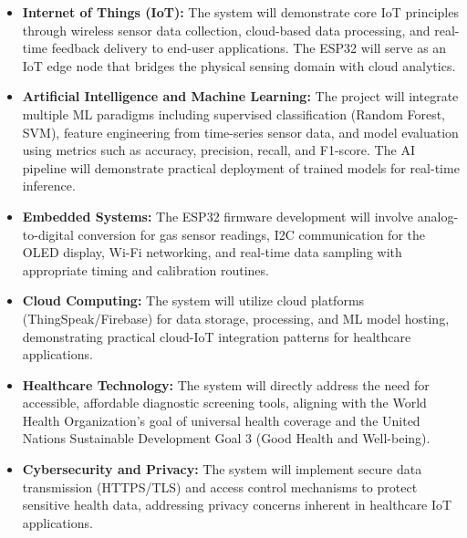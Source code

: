 \begin{itemize}[leftmargin=1.5cm]
\item \textbf{Internet of Things (IoT):} The system will demonstrate core IoT principles through wireless sensor data collection, cloud-based data processing, and real-time feedback delivery to end-user applications. The ESP32 will serve as an IoT edge node that bridges the physical sensing domain with cloud analytics.

\item \textbf{Artificial Intelligence and Machine Learning:} The project will integrate multiple ML paradigms including supervised classification (Random Forest, SVM), feature engineering from time-series sensor data, and model evaluation using metrics such as accuracy, precision, recall, and F1-score. The AI pipeline will demonstrate practical deployment of trained models for real-time inference.

\item \textbf{Embedded Systems:} The ESP32 firmware development will involve analog-to-digital conversion for gas sensor readings, I2C communication for the OLED display, Wi-Fi networking, and real-time data sampling with appropriate timing and calibration routines.

\item \textbf{Cloud Computing:} The system will utilize cloud platforms (ThingSpeak/Firebase) for data storage, processing, and ML model hosting, demonstrating practical cloud-IoT integration patterns for healthcare applications.

\item \textbf{Healthcare Technology:} The system will directly address the need for accessible, affordable diagnostic screening tools, aligning with the World Health Organization's goal of universal health coverage and the United Nations Sustainable Development Goal 3 (Good Health and Well-being).

\item \textbf{Cybersecurity and Privacy:} The system will implement secure data transmission (HTTPS/TLS) and access control mechanisms to protect sensitive health data, addressing privacy concerns inherent in healthcare IoT applications.
\end{itemize}
